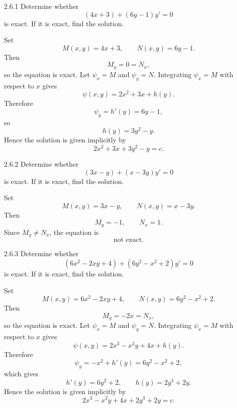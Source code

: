 \documentclass[11pt,oneside]{article}
\begin{document}
\begin{problem}{2.6.1}
Determine whether
\[
    (4x+3)+(6y-1)y'=0
\]
is exact. If it is exact, find the solution.
\end{problem}

\begin{solution}
Set
\[
    M(x,y)=4x+3,
    \qquad
    N(x,y)=6y-1.
\]
Then
\[
    M_y=0=N_x,
\]
so the equation is exact. Let $\psi_x=M$ and $\psi_y=N$. Integrating $\psi_x=M$ with respect to $x$ gives
\[
    \psi(x,y)=2x^2+3x+h(y).
\]
Therefore
\[
    \psi_y=h'(y)=6y-1,
\]
so
\[
    h(y)=3y^2-y.
\]
Hence the solution is given implicitly by
\[
    \boxed{2x^2+3x+3y^2-y=c}.
\]
\end{solution}

\begin{problem}{2.6.2}
Determine whether
\[
    (3x-y)+(x-3y)y'=0
\]
is exact. If it is exact, find the solution.
\end{problem}

\begin{solution}
Set
\[
    M(x,y)=3x-y,
    \qquad
    N(x,y)=x-3y.
\]
Then
\[
    M_y=-1,
    \qquad
    N_x=1.
\]
Since $M_y\neq N_x$, the equation is
\[
    \boxed{\text{not exact}}.
\]
\end{solution}

\begin{problem}{2.6.3}
Determine whether
\[
    (6x^2-2xy+4)+(6y^2-x^2+2)y'=0
\]
is exact. If it is exact, find the solution.
\end{problem}

\begin{solution}
Set
\[
    M(x,y)=6x^2-2xy+4,
    \qquad
    N(x,y)=6y^2-x^2+2.
\]
Then
\[
    M_y=-2x=N_x,
\]
so the equation is exact. Let $\psi_x=M$ and $\psi_y=N$. Integrating $\psi_x=M$ with respect to $x$ gives
\[
    \psi(x,y)=2x^3-x^2y+4x+h(y).
\]
Therefore
\[
    \psi_y=-x^2+h'(y)=6y^2-x^2+2,
\]
which gives
\[
    h'(y)=6y^2+2,
    \qquad
    h(y)=2y^3+2y.
\]
Hence the solution is given implicitly by
\[
    \boxed{2x^3-x^2y+4x+2y^3+2y=c}.
\]
\end{solution}
\end{document}
